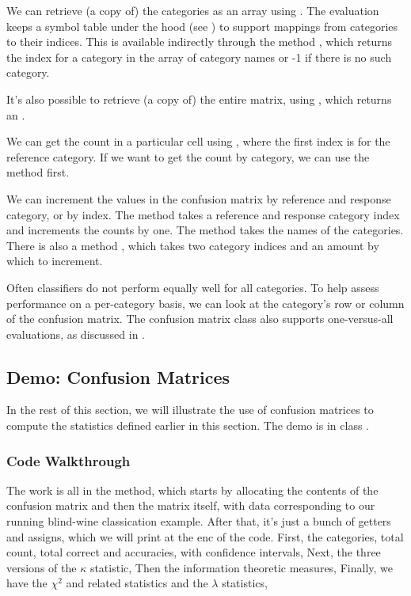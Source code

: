 We can retrieve (a copy of) the categories as an array using
.  The evaluation keeps a symbol table under the
hood (see ) to support mappings from categories
to their indices.  This is available indirectly through the method
, which returns the index for a category in the
array of category names or -1 if there is no such category.

It's also possible to retrieve (a copy of) the entire matrix, using
, which returns an .  

We can get the count in a particular cell using ,
where the first index is for the reference category.  If we want to
get the count by category, we can use the  method
first.

We can increment the values in the confusion matrix by reference and
response category, or by index.  The method 
takes a reference and response category index and increments the
counts by one.  The method  takes
the names of the categories.  There is also a method
, which takes two category indices
and an amount by which to increment.

Often classifiers do not perform equally well for all categories.  To
help assess performance on a per-category basis, we can look at the
category's row or column of the confusion matrix.  The confusion
matrix class also supports one-versus-all evaluations, as
discussed in .


\subsection{Demo: Confusion Matrices}\label{section:classifier-eval-confusion-matrix-demo}

In the rest of this section, we will illustrate the use of confusion
matrices to compute the statistics defined earlier in this section.
The demo is in class .

\subsubsection{Code Walkthrough}

The work is all in the  method, which starts by
allocating the contents of the confusion matrix and then the matrix
itself, with data corresponding to our running blind-wine classication
example.
%
%
After that, it's just a bunch of getters and assigns, which we will
print at the enc of the code.  First, the categories, total count,
total correct and accuracies, with confidence intervals,
%
%
Next, the three versions of the $\kappa$ statistic,
%
%
Then the information theoretic measures,
%
%
Finally, we have the $\chi^2$ and related statistics and the $\lambda$ statistics,
%


